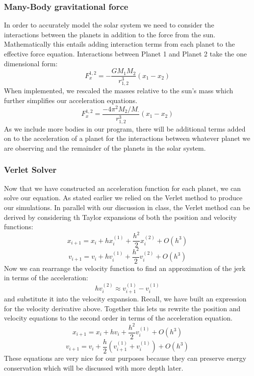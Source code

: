 \documentclass{article}
\begin{document}
\subsubsection{Many-Body gravitational force}
In order to accurately model the solar system we need to consider the interactions between the planets in addition to the force from the sun. Mathematically this entails adding interaction terms from each planet to the effective force equation. Interactions between Planet 1 and Planet 2 take the one dimensional form: 
\begin{equation}
 F_{x}^{1,2}=-\frac{GM_1M_2}{r_{1,2}^3}(x_1-x_2)
\end{equation}
When implemented, we rescaled the masses relative to the sun's mass which further simplifies our acceleration equations. 
\begin{equation}
F_{x}^{1,2} = \frac{-4 \pi^2 M_2/M_\cdot}{r^3_{1,2}} (x_1-x_2)
\end{equation}
As we include more bodies in our program, there will be additional terms added on to the acceleration of a planet for the interactions between whatever planet we are observing and the remainder of the planets in the solar system. 
\subsubsection{Verlet Solver}
Now that we have constructed an acceleration function for each planet, we can solve our equation. As stated earlier we relied on the Verlet method to produce our simulations. In parallel with our discussion in class\cite{morten github}, the Verlet method can be derived by considering th Taylor expansions of both the position and velocity functions: 
\begin{equation}
x_{i+1} = x_i+hx^{(1)}_i+\frac{h^2}{2}x^{(2)}_i+O(h^3)
\end{equation}
\begin{equation}
v_{i+1} = v_i+hv^{(1)}_i+\frac{h^2}{2}v^{(2)}_i+O(h^3)
\end{equation}
Now we can rearrange the velocity function to find an approximation of the jerk in terms of the acceleration:   
\begin{equation}
hv^{(2)}_i\approx v^{(1)}_{i+1}-v^{(1)}_i
\end{equation}
and substitute it into the velocity expansion. Recall, we have built an expression for the velocity derivative above. Together this lets us rewrite the position and velocity equations to the second order in terms of the acceleration equation. 
\begin{equation}
x_{i+1} = x_i+hv_i+\frac{h^2}{2}v^{(1)}_{i}+O(h^3)
\end{equation}
\begin{equation}
v_{i+1} = v_i+\frac{h}{2}\left( v^{(1)}_{i+1}+v^{(1)}_{i}\right)+O(h^3)
\end{equation}
These equations are very nice for our purposes because they can preserve energy conservation which will be discussed with more depth later.
\end{document}

